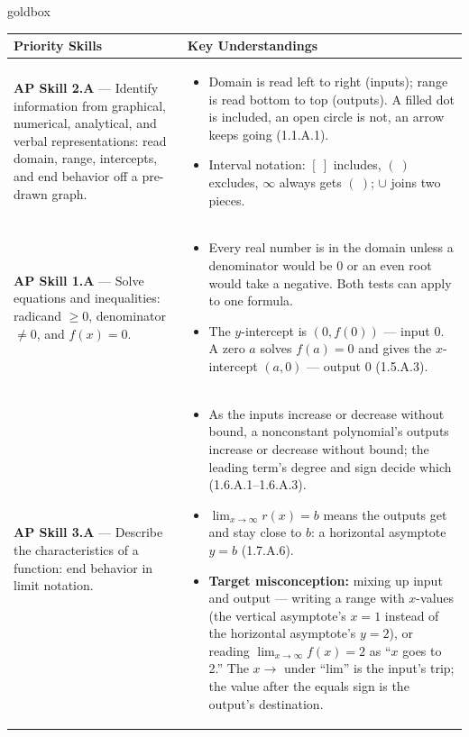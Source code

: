 \documentclass[10pt]{article}
\begin{document}
\renewcommand{\arraystretch}{1.6}
\begin{skillbox}{goldbox}
\begin{tabularx}{\linewidth}{@{}X X@{}}
\textbf{Priority Skills} &
\textbf{Key Understandings} \\
\midrule
\textbf{AP Skill 2.A} --- Identify information from graphical, numerical, analytical, and
verbal representations: read domain, range, intercepts, and end behavior off a pre-drawn graph. &
\begin{itemize}[leftmargin=1.2em,itemsep=2pt,topsep=0pt]
  \item Domain is read left to right (inputs); range is read bottom to top (outputs). A filled
        dot is included, an open circle is not, an arrow keeps going (1.1.A.1).
  \item Interval notation: $[\ ]$ includes, $(\ )$ excludes, $\infty$ always gets $(\ )$;
        $\cup$ joins two pieces.
\end{itemize} \\
\textbf{AP Skill 1.A} --- Solve equations and inequalities: radicand $\ge 0$, denominator
$\ne 0$, and $f(x) = 0$. &
\begin{itemize}[leftmargin=1.2em,itemsep=2pt,topsep=0pt]
  \item Every real number is in the domain unless a denominator would be 0 or an even root
        would take a negative. Both tests can apply to one formula.
  \item The $y$-intercept is $(0, f(0))$ --- input 0. A zero $a$ solves $f(a) = 0$ and gives
        the $x$-intercept $(a, 0)$ --- output 0 (1.5.A.3).
\end{itemize} \\
\textbf{AP Skill 3.A} --- Describe the characteristics of a function: end behavior in limit
notation. &
\begin{itemize}[leftmargin=1.2em,itemsep=2pt,topsep=0pt]
  \item As the inputs increase or decrease without bound, a nonconstant polynomial's outputs
        increase or decrease without bound; the leading term's degree and sign decide which
        (1.6.A.1--1.6.A.3).
  \item $\lim_{x \to \infty} r(x) = b$ means the outputs get and stay close to $b$: a
        horizontal asymptote $y = b$ (1.7.A.6).
  \item \textbf{Target misconception:} mixing up input and output --- writing a range with
        $x$-values (the vertical asymptote's $x = 1$ instead of the horizontal asymptote's
        $y = 2$), or reading $\lim_{x \to \infty} f(x) = 2$ as ``$x$ goes to 2.'' The $x \to$
        under ``lim'' is the input's trip; the value after the equals sign is the output's
        destination.
\end{itemize} \\
\end{tabularx}
\end{skillbox}
\end{document}
